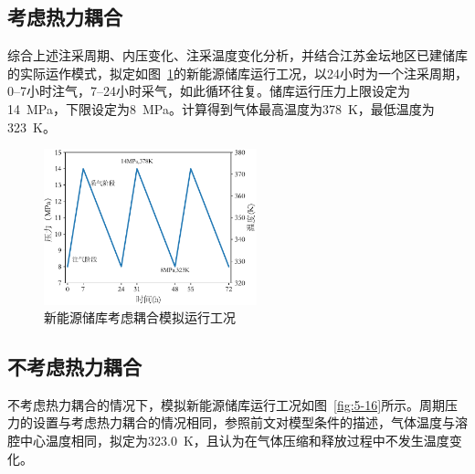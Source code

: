 \subsection{考虑热力耦合}
综合上述注采周期、内压变化、注采温度变化分析，并结合江苏金坛地区已建储库的实际运作模式，拟定如图~\ref{fig:5-1}的新能源储库运行工况，以24小时为一个注采周期，\numrange{0}{7}小时注气，\numrange{7}{24}小时采气，如此循环往复。储库运行压力上限设定为\SI{14}{MPa}，下限设定为\SI{8}{MPa}。计算得到气体最高温度为\SI{378}{K}，最低温度为\SI{323}{K}。

\begin{figure}[ht!]
    \centering
    \includegraphics[width=0.55\textwidth]{img/chap5/储气库模拟运行工况.pdf}
    \caption{新能源储库考虑耦合模拟运行工况}
    \label{fig:5-1}
\end{figure}


\subsection{不考虑热力耦合}
不考虑热力耦合的情况下，模拟新能源储库运行工况如图~\ref{fig:5-16}所示。周期压力的设置与考虑热力耦合的情况相同，参照前文对模型条件的描述，气体温度与溶腔中心温度相同，拟定为\SI{323.0}{K}，且认为在气体压缩和释放过程中不发生温度变化。

